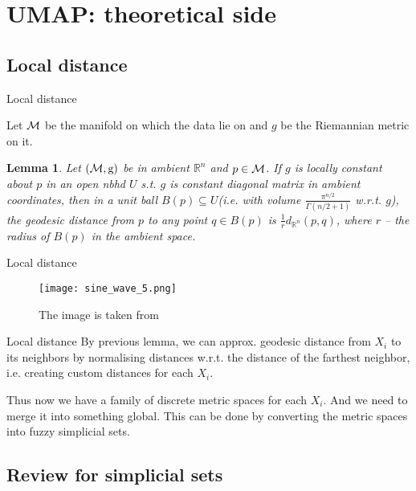 \documentclass{beamer}
\newtheorem*{lemma*}{Lemma}
\theoremstyle{named}
\begin{document}
\section{UMAP: theoretical side}

\subsection{Local distance}

\begin{frame}{Local distance}
	
	Let $\cal{M}$ be the manifold on which the data lie on and $g$ be the Riemannian metric on it.
	
	\begin{lemma*}
		Let $(\cal{M}, \text{g} )$ be in ambient $\mathbb{R}^n$ and $p \in \cal{M}$. If $g$ is locally constant about $p$ in an open nbhd $U$ s.t. $g$ is constant diagonal matrix in ambient coordinates, then in a unit ball $B(p) \subseteq U$(i.e. with volume $\frac{\pi^{n/2}}{\Gamma(n/2+1)}$ w.r.t. $g$), the geodesic distance from $p$ to any point $q \in B(p)$ is $\frac{1}{r}d_{\mathbb{R}^n}(p,q)$, where $r$ -- the radius of $B(p)$ in the ambient space.
	\end{lemma*}
	
\end{frame}

\begin{frame}{Local distance}
			\begin{figure}[htp]
		\centering
		\texttt{[image: sine\_wave\_5.png]}
		\caption{The image is taken from \cite{docs}}
	\end{figure}
\end{frame}


\begin{frame}{Local distance}
	By previous lemma, we can approx. geodesic distance from $X_i$ to its neighbors by normalising distances w.r.t. the distance of the farthest neighbor, i.e. creating custom distances for each $X_i$. 
	
	Thus now we have a family of discrete metric spaces for each $X_i$. And we need to merge it into something global. This can be done by converting the metric spaces into fuzzy simplicial sets.
\end{frame}

\subsection{Review for simplicial sets}
\end{document}
